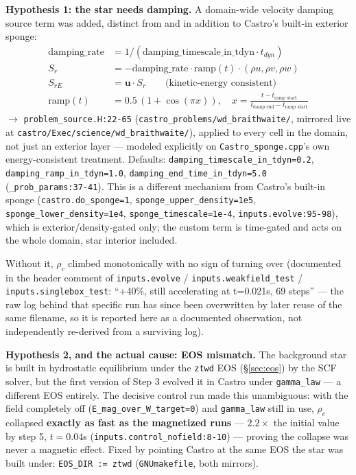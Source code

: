 \documentclass[11pt,a4paper]{scrartcl}
\newcommand{\code}[1]{\texttt{\small #1}}
\begin{document}
\textbf{Hypothesis 1: the star needs damping.} A domain-wide velocity
damping source term was added, distinct from and in addition to
Castro's built-in exterior sponge:
\[
\begin{aligned}
\text{damping\_rate} &= 1 / (\text{damping\_timescale\_in\_tdyn} \cdot t_{dyn})\\
S_r &= -\text{damping\_rate}\cdot\text{ramp}(t)\cdot(\rho u,\rho v,\rho w)\\
S_{rE} &= \mathbf{u}\cdot S_r \qquad \text{(kinetic-energy consistent)}\\
\text{ramp}(t) &= 0.5\,(1+\cos(\pi x)),\quad
  x = \frac{t - t_{\text{ramp start}}}{t_{\text{damp end}} - t_{\text{ramp start}}}
\end{aligned}
\]
$\to$ \code{problem\_source.H:22-65} (\code{castro\_problems/wd\_braithwaite/},
mirrored live at \code{castro/Exec/science/wd\_braithwaite/}), applied
to every cell in the domain, not just an exterior layer --- modeled
explicitly on \code{Castro\_sponge.cpp}'s own energy-consistent
treatment. Defaults: \code{damping\_timescale\_in\_tdyn=0.2},
\code{damping\_ramp\_in\_tdyn=1.0}, \code{damping\_end\_time\_in\_tdyn=5.0}
(\code{\_prob\_params:37-41}). This is a different mechanism from
Castro's built-in sponge (\code{castro.do\_sponge=1},
\code{sponge\_upper\_density=1e5}, \code{sponge\_lower\_density=1e4},
\code{sponge\_timescale=1e-4}, \code{inputs.evolve:95-98}), which is
exterior/density-gated only; the custom term is time-gated and acts on
the whole domain, star interior included.

Without it, $\rho_c$ climbed monotonically with no sign of turning over
(documented in the header comment of \code{inputs.evolve} /
\code{inputs.weakfield\_test} / \code{inputs.singlebox\_test}: ``+40\%,
still accelerating at t=0.021s, 69 steps'' --- the raw log behind that
specific run has since been overwritten by later reuse of the same
filename, so it is reported here as a documented observation, not
independently re-derived from a surviving log).

\textbf{Hypothesis 2, and the actual cause: EOS mismatch.} The
background star is built in hydrostatic equilibrium under the
\code{ztwd} EOS (\S\ref{sec:eos}) by the SCF solver, but the first
version of Step 3 evolved it in Castro under \code{gamma\_law} --- a
different EOS entirely. The decisive control run made this unambiguous:
with the field completely off (\code{E\_mag\_over\_W\_target=0}) and
\code{gamma\_law} still in use, $\rho_c$ collapsed \textbf{exactly as
fast as the magnetized runs} --- $2.2\times$ the initial value by step
5, $t=0.04$s (\code{inputs.control\_nofield:8-10}) --- proving the
collapse was never a magnetic effect. Fixed by pointing Castro at the
same EOS the star was built under: \code{EOS\_DIR := ztwd}
(\code{GNUmakefile}, both mirrors).
\end{document}
